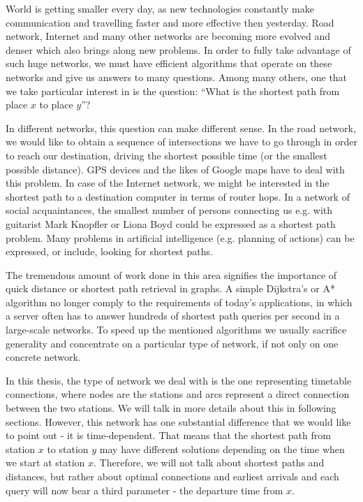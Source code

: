 \noindent World is getting smaller every day, as new technologies constantly make communication and travelling faster and more effective then yesterday. Road network, Internet and many other networks are becoming more evolved and denser which also brings along new problems. In order to fully take advantage of such huge networks, we must have efficient algorithms that operate on these networks and give us answers to many questions. Among many others, one that we take particular interest in is the question: ``What is the shortest path from place $x$ to place $y$''?

In different networks, this question can make different sense. In the road network, we would like to obtain a sequence of intersections we have to go through in order to reach our destination, driving the shortest possible time (or the smallest possible distance). GPS devices and the likes of Google maps have to deal with this problem. In case of the Internet network, we might be interested in the shortest path to a destination computer in terms of router hops. In a network of social acquaintances, the smallest number of persons connecting us e.g. with guitarist Mark Knopfler or Liona Boyd could be expressed as a shortest path problem. Many problems in artificial intelligence (e.g. planning of actions) can be expressed, or include, looking for shortest paths.

The tremendous amount of work done in this area signifies the importance of quick distance or shortest path retrieval in graphs. A simple Dijkstra's or A* algorithm no longer comply to the requirements of today's applications, in which a server often has to answer hundreds of shortest path queries per second in a large-scale networks. To speed up the mentioned algorithms we usually sacrifice generality and concentrate on a particular type of network, if not only on one concrete network.

In this thesis, the type of network we deal with is the one representing timetable connections, where nodes are the stations and arcs represent a direct connection between the two stations. We will talk in more details about this in following sections. However, this network has one substantial difference that we would like to point out - it is time-dependent. That means that the shortest path from station $x$ to station $y$ may have different solutions depending on the time when we start at station $x$. Therefore, we will not talk about shortest paths and distances, but rather about optimal connections and earliest arrivals and each query will now bear a third parameter - the departure time from $x$. \\

